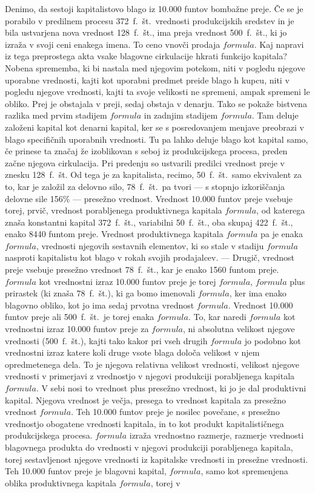 \documentclass[kapital_02.tex]{subfiles}
\begin{document}
Denimo, da sestoji kapitalistovo blago iz 10.000 funtov bombažne preje. Če se je porabilo v predilnem procesu 372~f.~št.\ vrednosti produkcijskih sredstev in je bila ustvarjena nova vrednost 128~f.~št., ima preja vrednost 500~f.~št., ki jo izraža v svoji ceni enakega imena. To ceno vnovči prodaja \( formula \). Kaj napravi iz tega preprostega akta vsake blagovne cirkulacije hkrati funkcijo kapitala? Nobena sprememba, ki bi nastala med njegovim potekom, niti v pogledu njegove uporabne vrednosti, kajti kot uporabni predmet preide blago h kupcu, niti v pogledu njegove vrednosti, kajti ta svoje velikosti ne spremeni, ampak spremeni le obliko. Prej je obstajala v preji, sedaj obstaja v denarju. Tako se pokaže bistvena razlika med prvim stadijem \( formula \) in zadnjim stadijem \( formula \). Tam deluje založeni kapital kot denarni kapital, ker se s posredovanjem menjave preobrazi v blago specifičnih uporabnih vrednosti. Tu pa lahko deluje blago kot kapital samo, če prinese ta značaj že izoblikovan s seboj iz produkcijskega procesa, preden začne njegova cirkulacija. Pri predenju so ustvarili predilci vrednost preje v znesku 128~f.~št. Od tega je za kapitalista, recimo, 50~f.~št.\ samo ekvivalent za to, kar je založil za delovno silo, 78~f.~št.\ pa tvori --- s stopnjo izkoriščanja delovne sile 156\% --- presežno vrednost. Vrednost 10.000 funtov preje vsebuje torej, prvič, vrednost porabljenega produktivnega kapitala \( formula \), od katerega znaša konstantni kapital 372~f.~št., variabilni 50~f.~št., oba skupaj 422~f.~št., enako 8440 funtom preje. Vrednost produktivnega kapitala \( formula \) pa je enaka \( formula \), vrednosti njegovih sestavnih elementov, ki so stale v stadiju \( formula \) nasproti kapitalistu kot blago v rokah svojih prodajalcev. --- Drugič, vrednost preje vsebuje presežno vrednost 78~f.~št., kar je enako 1560 funtom preje. \( formula \) kot vrednostni izraz 10.000 funtov preje je torej \( formula \), \( formula \) plus prirastek (ki znaša 78~f.~št.), ki ga bomo imenovali \( formula \), ker ima enako blagovno obliko, kot jo ima sedaj prvotna vrednost \( formula \). Vrednost 10.000 funtov preje ali 500~f.~št.\ je torej enaka \( formula \). To, kar naredi \( formula \) kot vrednostni izraz 10.000 funtov preje za \( formula \), ni absolutna velikost njegove vrednosti (500~f.~št.), kajti tako kakor pri vseh drugih \( formula \) jo podobno kot vrednostni izraz katere koli druge vsote blaga določa velikost v njem opredmetenega dela. To je njegova relativna velikost vrednosti, velikost njegove vrednosti v primerjavi z vrednostjo v njegovi produkciji porabljenega kapitala \( formula \). V sebi nosi to vrednost plus presežno vrednost, ki jo je dal produktivni kapital. Njegova vrednost je večja, presega to vrednost kapitala za presežno vrednost \( formula \). Teh 10.000 funtov preje je nosilec povečane, s presežno vrednostjo obogatene vrednosti kapitala, in to kot produkt kapitalističnega produkcijskega procesa. \( formula \) izraža vrednostno razmerje, razmerje vrednosti blagovnega produkta do vrednosti v njegovi produkciji porabljenega kapitala, torej sestavljenost njegove vrednosti iz kapitalske vrednosti in presežne vrednosti. Teh 10.000 funtov preje je blagovni kapital, \( formula \), samo kot spremenjena oblika produktivnega kapitala \( formula \), torej v 
\end{document}
